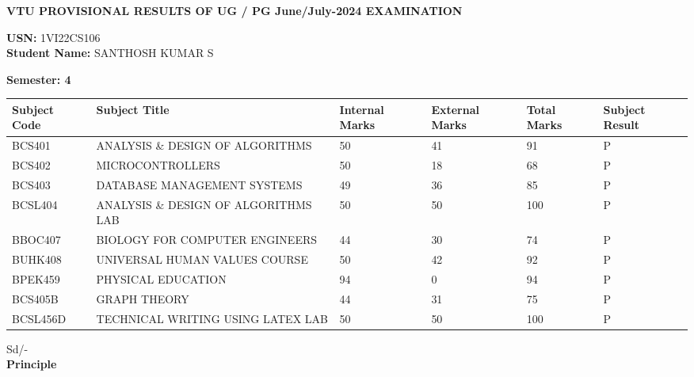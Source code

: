 \documentclass[a4paper,12pt]{article}
\begin{document}
    

\begin{center}
    \textbf{VTU PROVISIONAL RESULTS OF UG / PG June/July-2024 EXAMINATION}
\end{center}

\vspace{0.5cm}

\noindent
\textbf{USN:} 1VI22CS106 \\
\textbf{Student Name:} SANTHOSH KUMAR S

\vspace{0.5cm}

\noindent
\textbf{Semester: 4}

\vspace{0.5cm}

\begin{center} %
\begin{tabular}{|m{2cm}|m{7cm}|m{2cm}|m{2cm}|m{2cm}|m{2cm}|}
    \hline
    \textbf{Subject Code} & \textbf{Subject Title} & \textbf{Internal Marks} & \textbf{External Marks} & \textbf{Total Marks} & \textbf{Subject Result} \\
    \hline
    BCS401 & ANALYSIS \& DESIGN OF ALGORITHMS & 50 & 41 & 91 & P \\
    \hline
    BCS402 & MICROCONTROLLERS & 50 & 18 & 68 & P \\
    \hline
    BCS403 & DATABASE MANAGEMENT SYSTEMS & 49 & 36 & 85 & P \\
    \hline
    BCSL404 & ANALYSIS \& DESIGN OF ALGORITHMS LAB & 50 & 50 & 100 & P \\
    \hline
    BBOC407 & BIOLOGY FOR COMPUTER ENGINEERS & 44 & 30 & 74 & P \\
    \hline
    BUHK408 & UNIVERSAL HUMAN VALUES COURSE & 50 & 42 & 92 & P \\
    \hline
    BPEK459 & PHYSICAL EDUCATION & 94 & 0 & 94 & P \\
    \hline
    BCS405B & GRAPH THEORY & 44 & 31 & 75 & P \\
    \hline
    BCSL456D & TECHNICAL WRITING USING LATEX LAB & 50 & 50 & 100 & P \\
    \hline
\end{tabular}
\end{center}

\vspace{1cm}

\vfill

\begin{flushright}
    Sd/- \\
    \textbf{Principle}
\end{flushright}

\vspace{0.5cm}

\noindent
\end{document}
